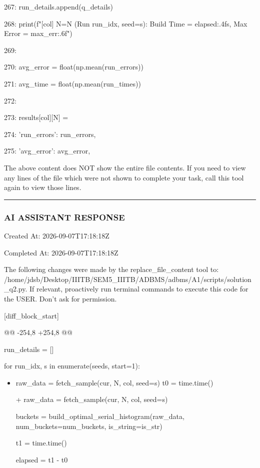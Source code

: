 \documentclass[11pt,a4paper]{article}
\begin{document}
267:                 run\_details.append(q\_details)

268:                 print(f"[{col}] N={N} (Run {run\_idx}, seed={s}): Build Time = {elapsed:.4f}s, Max Error = {max\_err:.6f}")

269:

270:             avg\_error = float(np.mean(run\_errors))

271:             avg\_time = float(np.mean(run\_times))

272:

273:             results[col][N] = {

274:                 'run\_errors': run\_errors,

275:                 'avg\_error': avg\_error,

The above content does NOT show the entire file contents. If you need to view any lines of the file which were not shown to complete your task, call this tool again to view those lines.


\hrule

\subsubsection{AI ASSISTANT RESPONSE}

Created At: 2026-09-07T17:18:18Z

Completed At: 2026-09-07T17:18:18Z

The following changes were made by the replace\_file\_content tool to: /home/jdsb/Desktop/IIITB/SEM5\_IIITB/ADBMS/adbms/A1/scripts/solution\_q2.py. If relevant, proactively run terminal commands to execute this code for the USER. Don't ask for permission.

[diff\_block\_start]

@@ -254,8 +254,8 @@

run\_details = []


for run\_idx, s in enumerate(seeds, start=1):

\begin{itemize}
\item                raw\_data = fetch\_sample(cur, N, col, seed=s)
t0 = time.time()

+                raw\_data = fetch\_sample(cur, N, col, seed=s)

buckets = build\_optimal\_serial\_histogram(raw\_data, num\_buckets=num\_buckets, is\_string=is\_str)

t1 = time.time()

elapsed = t1 - t0


\end{itemize}}
\end{document}
